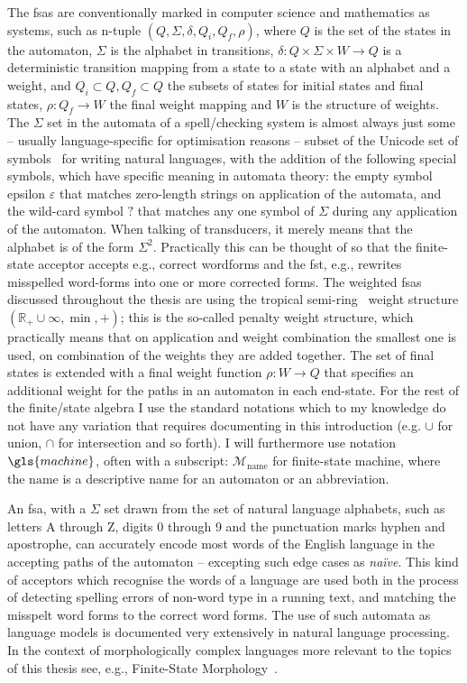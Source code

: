\documentclass[officiallayout,final]{unihelcompling}
\begin{document}
The \glspl{fsa} are conventionally marked in computer science and mathematics
as systems, such as n-tuple $(Q, \Sigma, \delta, Q_i, Q_f, \rho)$, where $Q$ is
the set of the states in the automaton, $\Sigma$ is the alphabet in
transitions, $\delta: Q \times \Sigma \times W \rightarrow Q$ is a
deterministic transition mapping from a state to a state with an alphabet and a
weight, and $Q_i \subset Q, Q_f \subset Q$ the subsets of states for initial
states and final states, $\rho: Q_f \rightarrow W$ the final weight mapping and
$W$ is the structure of weights.  The $\Sigma$ set in the automata of a
spell\-/checking system is almost always just some -- usually language-specific
for optimisation reasons -- subset of the Unicode set of
symbols~\citep{unicode} for writing natural languages, with the addition of the
following special symbols, which have specific meaning in automata theory: the
empty symbol epsilon $\varepsilon$ that matches zero-length strings on application
of the automata, and the wild-card symbol $?$ that matches any one symbol of
$\Sigma$ during any application of the automaton.  When talking of transducers,
it merely means that the alphabet is of the form $\Sigma^2$. Practically this
can be thought of so that the \gls{finite-state acceptor} accepts e.g., correct
wordforms and the \gls{fst}, e.g., rewrites misspelled word-forms into one or
more corrected forms.  The weighted \glspl{fsa} discussed throughout the thesis
are using the \gls{tropical semi-ring}~\citep{mohri1997finitestate} weight
structure $(\mathbb{R}_+ \cup \infty, \min, +)$; this is the so-called penalty
weight structure, which practically means that on application and weight
combination the smallest one is used, on combination of the weights they are
added together. The set of final states is extended with a final weight
function $\rho: W \rightarrow Q$ that specifies an additional weight for the
paths in an automaton in each end-state. For the rest of the finite\-/state
algebra I use the standard notations which to my knowledge do not have any
variation that requires documenting in this introduction (e.g.  $\cup$ for
union, $\cap$ for intersection and so forth). I will furthermore use notation
$\gls{machine}$, often with a subscript: $\mathcal{M}_\mathrm{name}$ for
finite-state machine, where the $\mathrm{name}$ is a descriptive name for an
automaton or an abbreviation.

An \gls{fsa}, with a $\Sigma$ set drawn from the set of natural language
alphabets, such as letters A through Z, digits 0 through 9 and the punctuation
marks hyphen and apostrophe, can accurately encode most words of the English
language in the accepting paths of the automaton -- excepting such edge cases
as \emph{naïve}. This kind of acceptors which recognise the words of a language
are used both in the process of detecting spelling errors of non-word type in a
running text, and matching the misspelt word forms to the correct word forms.
The use of such automata as language models is documented very extensively in
natural language processing.  In the context of morphologically complex
languages more relevant to the topics of this thesis see, e.g., Finite-State
Morphology~\citep{beesley2003finite,beesley2004morphological}.
\end{document}
